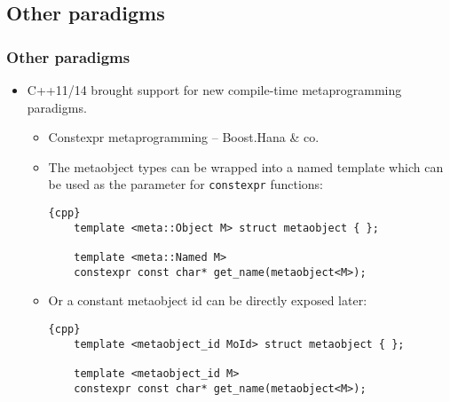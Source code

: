 \documentclass[compress,table,xcolor=table]{beamer}
\begin{document}
\subsection{Other paradigms}
\begin{frame}[fragile]
\frametitle{Other paradigms}
  \begin{itemize}
    \item C++11/14 brought support for new compile-time metaprogramming paradigms.
    \begin{itemize}
      \small
      \item Constexpr metaprogramming -- Boost.Hana \& co.
      \item The metaobject types can be wrapped into a named template which
        can be used as the parameter for \texttt{constexpr} functions:
      \begin{lstlisting}{cpp}
	template <meta::Object M> struct metaobject { };

	template <meta::Named M>
	constexpr const char* get_name(metaobject<M>);
      \end{lstlisting}
      \item Or a constant metaobject id can be directly exposed later:
      \begin{lstlisting}{cpp}
	template <metaobject_id MoId> struct metaobject { };

	template <metaobject_id M>
	constexpr const char* get_name(metaobject<M>);
      \end{lstlisting}
    \end{itemize}
  \end{itemize}
\end{frame}
\end{document}
